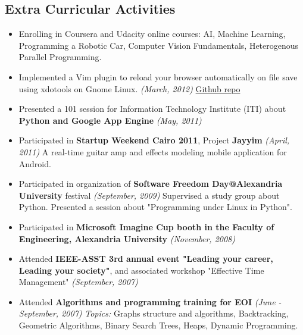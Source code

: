 \documentclass{res}
\newcommand{\interval}[1]{\textit{(#1)} }
\begin{document}
\begin{resume}
\section{Extra Curricular Activities}
  \begin{itemize}[leftmargin=*]
    \item Enrolling in Coursera and Udacity online courses: AI, Machine Learning, Programming a Robotic Car, Computer Vision Fundamentals, Heterogenous Parallel Programming.
    \item Implemented a Vim plugin to reload your browser automatically on file save using xdotools on Gnome Linux. \interval{March, 2012} \href{https://github.com/lordm/vim-browser-reload-linux}{Github repo}
    \item Presented a 101 session for Information Technology Institute (ITI) about \textbf{Python and Google App Engine} \interval{May, 2011}
    \item Participated in \textbf{Startup Weekend Cairo 2011}, Project \textbf{Jayyim} \interval{April, 2011}
      \subitem A real-time guitar amp and effects modeling mobile application for Android.
    \item Participated in organization of \textbf{Software Freedom Day@Alexandria University} festival \interval{September, 2009}
      \subitem Supervised a study group about Python.
      \subitem Presented a session about "Programming under Linux in Python".
    \item Participated in \textbf{Microsoft Imagine Cup booth in the Faculty of Engineering, Alexandria University} \interval{November, 2008}
    \item Attended \textbf{IEEE-ASST 3rd annual event "Leading your career, Leading your society"}, and associated workshop "Effective Time Management" \interval{September, 2007}
    \item Attended \textbf{Algorithms and programming training for EOI} \interval{June - September, 2007}
      \subitem \textit{Topics:} Graphs structure and algorithms, Backtracking, Geometric Algorithms, Binary Search Trees, Heaps, Dynamic Programming.
    \end{itemize}


\end{resume}
\end{document}
